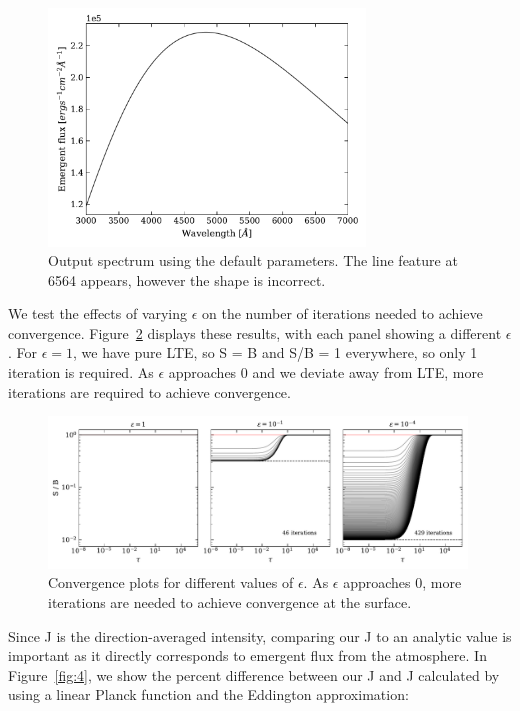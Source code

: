 \documentclass[12pt]{article}
\begin{document}
\begin{figure}[ht]
 \centering
 \includegraphics[width=0.75\textwidth]{spectrum.pdf}
 \caption{Output spectrum using the default parameters. The line feature at 6564 \text{\AA } appears, however the shape is incorrect.}
  \label{fig:2}
\end{figure}

We test the effects of varying $\epsilon$ on the number of iterations needed to achieve convergence. Figure~\ref{fig:3} displays these results, with each panel showing a different $\epsilon$. For $\epsilon = 1$, we have pure LTE, so S = B and S/B = 1 everywhere, so only 1 iteration is required. As $\epsilon$ approaches 0 and we deviate away from LTE, more iterations are required to achieve convergence. 

\begin{figure}[ht]
 \centering
 \includegraphics[width=0.99\textwidth]{eps_convergence.pdf}
 \caption{Convergence plots for different values of $\epsilon$. As $\epsilon$ approaches 0, more iterations are needed to achieve convergence at the surface.}
   \label{fig:3}
\end{figure}

Since J is the direction-averaged intensity, comparing our J to an analytic value is important as it directly corresponds to emergent flux from the atmosphere. In Figure~\ref{fig:4}, we show the percent difference between our J and J calculated by using a linear Planck function and the Eddington approximation: 
\end{document}
